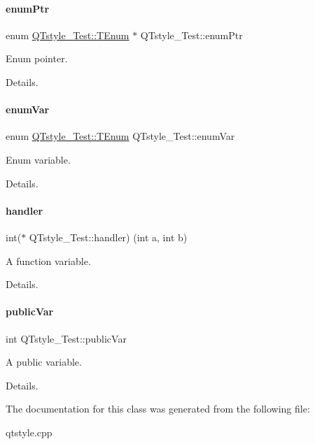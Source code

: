 \paragraph{\texorpdfstring{enumPtr}{enumPtr}}
{\footnotesize\ttfamily enum \mbox{\hyperlink{class_q_tstyle___test_a0525f798cda415a94fedeceb806d2c49}{Q\+Tstyle\+\_\+\+Test\+::\+T\+Enum}}
         $\ast$ Q\+Tstyle\+\_\+\+Test\+::enum\+Ptr}



Enum pointer. 

Details. \mbox{\label{class_q_tstyle___test_adb265d815b43f1f7f0de0e8b8852a5d0}} 
\paragraph{\texorpdfstring{enumVar}{enumVar}}
{\footnotesize\ttfamily enum \mbox{\hyperlink{class_q_tstyle___test_a0525f798cda415a94fedeceb806d2c49}{Q\+Tstyle\+\_\+\+Test\+::\+T\+Enum}}
          Q\+Tstyle\+\_\+\+Test\+::enum\+Var}



Enum variable. 

Details. \mbox{\label{class_q_tstyle___test_a79dd4e5498f09057775a819d911349e2}} 
\paragraph{\texorpdfstring{handler}{handler}}
{\footnotesize\ttfamily int($\ast$ Q\+Tstyle\+\_\+\+Test\+::handler) (int a, int b)}



A function variable. 

Details. \mbox{\label{class_q_tstyle___test_aabf7b2e9ed83ea44aca4d213baae06d3}} 
\paragraph{\texorpdfstring{publicVar}{publicVar}}
{\footnotesize\ttfamily int Q\+Tstyle\+\_\+\+Test\+::public\+Var}



A public variable. 

Details. 

The documentation for this class was generated from the following file\+:\begin{DoxyCompactItemize}
\item 
qtstyle.\+cpp\end{DoxyCompactItemize}
